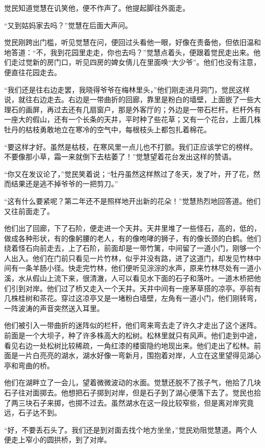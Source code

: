 \par 觉民知道觉慧在讥笑他，便不作声了。他提起脚往外面走。
\par “又到姑妈家去吗？”觉慧在后面大声问。
\par 觉民刚跨出门槛，听见觉慧在问，便回过头看他一眼，好像在责备他，但依旧温和地答道：“不，我到花园里走走，你也去吗？”觉慧点着头，便跟着觉民走出来。他们走过觉新的房门口，听见四房的婢女倩儿在里面唤“大少爷”。他们也没有注意，便直往花园走去。
\par “我们还是往右边走罢，我晓得爷爷在梅林里头，”他们刚走进月洞门，觉民这样说，就往右边走去。右边是一带曲折的回廊，靠里是粉白的墙壁，上面嵌了一些大理石的画屏，再过去还有几扇窗户，那是外客厅的；外边是一带石栏杆。栏杆外有一座大的假山，还有一个长条的天井，平时种了些花草；又有一个花台，上面几株牡丹的枯枝勇敢地立在寒冷的空气中，每根枝头上都包扎着棉花。
\par “要这样才好。虽然是枯枝，在寒风里一点儿也不打颤。我们正应该学它的榜样。不要像那小草，霜一来就倒下去枯萎了！”觉慧望着花台发出这样的赞语。
\par “你又在发议论了，”觉民笑着说；“牡丹虽然这样熬过了冬天，发了叶，开了花，然而结果还是逃不掉爷爷的一把剪刀。”
\par “这有什么要紧呢？第二年还不是照样地开出新的花朵！”觉慧热烈地回答道。他们又往前面走了。
\par 他们出了回廊，下了石阶，便走进一个天井。天井里堆了一些怪石，高的，低的，做成各种形状，有的像躬腰的老人，有的像咆哮的狮子，有的像长颈的白鹤。他们绕着怪石向前走去，上了石阶，前面却是一带竹篱，中间留了一道小门，刚够一个人出入。他们在门前只看见一片竹林，似乎并没有路，进了这道门，却发见竹林中间有一条羊肠小径。快走完竹林，他们便听见淙淙的水声，原来竹林尽处有一道小溪，水从假山上流下来，很清澈，人可以看见水下面的石子和落叶。一道木桥把他们引到对岸。他们过了桥又走入一个天井。天井中间有一座茅草搭的凉亭。亭前有几株桂树和茶花。穿过这凉亭又是一堵粉白墙壁，左角有一道小门，他们刚转弯，一阵波涛的声音突然送入耳里。
\par 他们被引入一带曲折的迷阵似的栏杆，他们弯来弯去走了许久才走出了这个迷阵。前面是一个大坝子，种了许多株高大的松树。松林里就只有风声。他们走到中途，看见右边一处松树比较稀疏，一角红漆的楼窗隐约地现出来。他们走出了松林。前面是一片白亮亮的湖水，湖水好像一弯新月，围抱着对岸，人立在这里望得见湖心亭和弯曲的桥。
\par 他们在湖畔立了一会儿，望着微微波动的水面。觉慧还脱不了孩子气，他拾了几块石子往对面掷去。他想把石子掷到对岸，但是石子到了湖心便落下去了。觉民也拾了两三块石子来掷，也掷不过去。虽然湖水在这一段比较窄些，但是离对岸究竟远，石子达不到。
\par “好，不要丢石头了。我们还是到对面去找个地方坐坐，”觉民劝阻觉慧道。两个人便走上窄小的圆拱桥，到了对岸。
